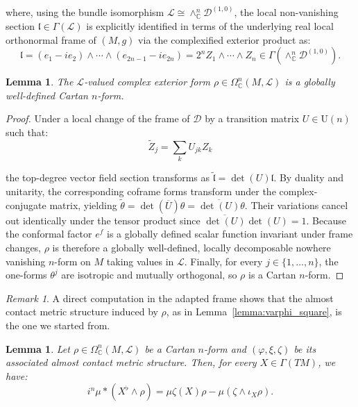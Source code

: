 \documentclass[10pt,a4paper,twoside,reqno]{amsart}
\theoremstyle{plain}
\newtheorem{lemma}[thm]{Lemma}
\theoremstyle{definition}
\theoremstyle{remark}
\newtheorem{remark}[thm]{Remark}
\def\C{\mathbb{C}}
\begin{document}
\noindent
where, using the bundle isomorphism $\mathcal{L} \cong \wedge^n_{\mathbb{C}} \mathcal{D}^{(1,0)}$, the local non-vanishing section $\mathfrak{l} \in \Gamma(\mathcal{L})$ is explicitly identified in terms of the underlying real local orthonormal frame of $(M,g)$ via the complexified exterior product as:
\begin{equation*}
\mathfrak{l} = (e_1 - i e_2) \wedge \cdots \wedge (e_{2n-1} - i e_{2n}) = 2^n Z_1 \wedge \cdots \wedge Z_n \in \Gamma(\wedge^n_{\mathbb{C}} \mathcal{D}^{(1,0)}).
\end{equation*}

\begin{lemma}
\label{lemma:rho-well-defined}
The $\mathcal{L}$-valued complex exterior form $\rho\in\Omega^n_\C(M,\mathcal{L})$ is a globally well-defined Cartan $n$-form.
\end{lemma}

\begin{proof}
Under a local change of the frame of $\mathcal{D}$ by a transition matrix $U \in \mathrm{U}(n)$ such that:
\begin{equation*}
\tilde{Z}_j = \sum_k U_{jk} Z_k    
\end{equation*}

\noindent
the top-degree vector field section transforms as $\tilde{\mathfrak{l}} = \det(U) \mathfrak{l}$. By duality and unitarity, the corresponding coframe forms transform under the complex-conjugate matrix, yielding $\tilde{\theta} = \det(\overline{U})\theta = \overline{\det(U)}\theta$. Their variations cancel out identically under the tensor product since $\overline{\det(U)}\det(U) = 1$. Because the conformal factor $e^f$ is a globally defined scalar function invariant under frame changes, $\rho$ is therefore a globally well-defined, locally decomposable nowhere vanishing $n$-form on $M$ taking values in $\mathcal{L}$. Finally, for every $j \in \{ 1, \dots, n\}$, the one-forms $\theta^j$ are isotropic and mutually orthogonal, so $\rho$ is a Cartan $n$-form.
\end{proof}

\begin{remark}
\label{remark:induced-structure}
A direct computation in the adapted frame shows that the almost contact metric structure induced by $\rho$, as in Lemma~\ref{lemma:varphi_square}, is the one we started from.
\end{remark}

\begin{lemma}
    \label{lem:identidad-algebraica}
    Let $\rho\in\Omega^n_\C(M,\mathcal{L})$ be a Cartan $n$-form and $(\varphi,\xi,\zeta)$ be its associated almost contact metric structure. Then, for every $X \in \Gamma (TM)$, we have:
    \begin{equation*}
        i^n \mu *(X^{\flat} \wedge \rho) = \mu\zeta(X)\rho - \mu(\zeta \wedge \iota_{X}\rho).
    \end{equation*}
\end{lemma}
\end{document}
